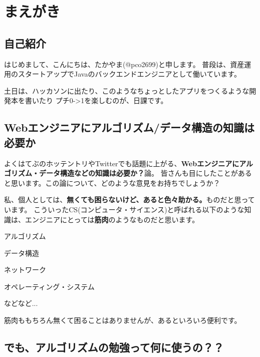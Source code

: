 \chapter{まえがき}
\label{chap:chap00-preface}

\section*{自己紹介}
\label{sec:-1}

はじめまして、こんにちは、たかやま(@pco2699)と申します。
普段は、資産運用のスタートアップでJavaのバックエンドエンジニアとして働いています。

土日は、ハッカソンに出たり、このようなちょっとしたアプリをつくるような開発本を書いたり
プチ0{-}\textgreater{}1を楽しむのが、日課です。

\section*{Webエンジニアにアルゴリズム/データ構造の知識は必要か}
\label{sec:-2}

よくはてぶのホッテントリやTwitterでも話題に上がる、\textbf{Webエンジニアにアルゴリズム・データ構造などの知識は必要か？}論。
皆さんも目にしたことがあると思います。この論について、どのような意見をお持ちでしょうか？

私、個人としては、\textbf{無くても困らないけど、あると色々助かる。}ものだと思っています。
こういったCS(コンピュータ・サイエンス)と呼ばれる以下のような知識は、エンジニアにとっては\textbf{筋肉}のようなものだと思います。

\begin{starteritemize}
\item アルゴリズム
\item データ構造
\item ネットワーク
\item オペレーティング・システム
\end{starteritemize}

などなど...

筋肉ももちろん無くて困ることはありませんが、あるといろいろ便利です。

\section*{でも、アルゴリズムの勉強って何に使うの？？}
\label{sec:-3}

